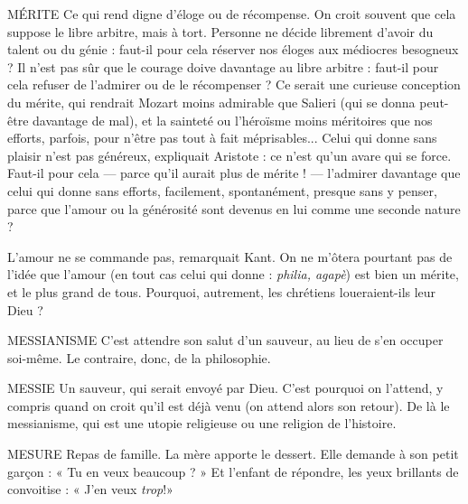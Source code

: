 MÉRITE Ce qui rend digne d’éloge ou de récompense. On croit souvent
que cela suppose le libre arbitre, mais à tort. Personne ne décide
librement d’avoir du talent ou du génie : faut-il pour cela réserver nos éloges
aux médiocres besogneux ? Il n’est pas sûr que le courage doive davantage au
libre arbitre : faut-il pour cela refuser de l’admirer ou de le récompenser ? Ce
serait une curieuse conception du mérite, qui rendrait Mozart moins admirable
que Salieri (qui se donna peut-être davantage de mal), et la sainteté ou
l’héroïsme moins méritoires que nos efforts, parfois, pour n'être pas tout à fait
méprisables...
Celui qui donne sans plaisir n’est pas généreux, expliquait Aristote : ce
n’est qu’un avare qui se force. Faut-il pour cela — parce qu’il aurait plus de
mérite ! — l’admirer davantage que celui qui donne sans efforts, facilement,
spontanément, presque sans y penser, parce que l’amour ou la générosité sont
devenus en lui comme une seconde nature ?

L'amour ne se commande pas, remarquait Kant. On ne m'ôtera pourtant
pas de l’idée que l’amour (en tout cas celui qui donne : {\it philia, agapè}) est bien
un mérite, et le plus grand de tous. Pourquoi, autrement, les chrétiens
loueraient-ils leur Dieu ?

MESSIANISME C'est attendre son salut d’un sauveur, au lieu de s’en
occuper soi-même. Le contraire, donc, de la philosophie.

MESSIE Un sauveur, qui serait envoyé par Dieu. C’est pourquoi on l'attend,
y compris quand on croit qu’il est déjà venu (on attend alors son
retour). De là le messianisme, qui est une utopie religieuse ou une religion de
l’histoire.

MESURE Repas de famille. La mère apporte le dessert. Elle demande à son
petit garçon : « Tu en veux beaucoup ? » Et l'enfant de répondre,
les yeux brillants de convoitise : « J’en veux {\it trop}!»

